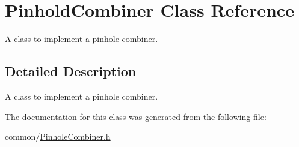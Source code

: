 \hypertarget{classPinholdCombiner}{
\section{PinholdCombiner Class Reference}
\label{classPinholdCombiner}
}


A class to implement a pinhole combiner.  




\subsection{Detailed Description}
A class to implement a pinhole combiner. 

The documentation for this class was generated from the following file:\begin{DoxyCompactItemize}
\item 
common/\hyperlink{PinholeCombiner_8h}{PinholeCombiner.h}\end{DoxyCompactItemize}
